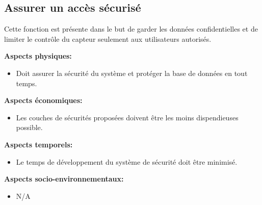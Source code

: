 \begin{table}[!htb]
\footnotesize
\centering
{}
\caption{Faisabilité des concepts pour la fonction afficher les données}
\label{t:Decision_affichage}
\end{table}


\subsection{Assurer un accès sécurisé}
Cette fonction est présente dans le but de garder les données confidentielles et de limiter le contrôle du capteur seulement aux utilisateurs autorisés.

\textbf{Aspects physiques:}
\begin{itemize}[label = {--}]
    \item Doit assurer la sécurité du système et protéger la base de données en tout temps.
\end{itemize}

\textbf{Aspects économiques:}
\begin{itemize}[label = {--}]
    \item Les couches de sécurités proposées doivent être les moins dispendieuses possible.
\end{itemize}

\textbf{Aspects temporels:}
\begin{itemize}[label = {--}]
    \item Le temps de développement du système de sécurité doit être minimisé.
\end{itemize}

\textbf{Aspects socio-environnementaux:}
\begin{itemize}[label = {--}]
    \item N/A %
\end{itemize}



